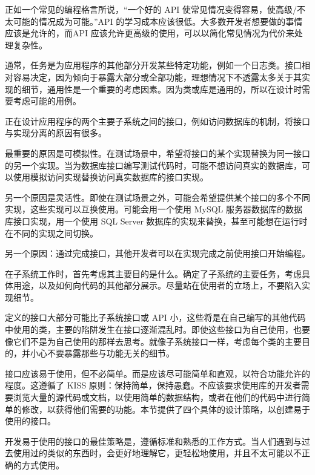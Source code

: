 正如一个常见的编程格言所说，“一个好的 API 使常见情况变得容易，使高级/不太可能的情况成为可能。”API 的学习成本应该很低。大多数开发者想要做的事情应该是允许的，而API 应该允许更高级的使用，可以以简化常见情况为代价来处理复杂性。


通常，任务是为应用程序的其他部分开发某些特定功能，例如一个日志类。接口相对容易决定，因为倾向于暴露大部分或全部功能，理想情况下不透露太多关于其实现的细节，通用性是一个重要的考虑因素。因为类或库是通用的，所以在设计时需要考虑可能的用例。


正在设计应用程序的两个主要子系统之间的接口，例如访问数据库的机制，将接口与实现分离的原因有很多。

最重要的原因是可模拟性。在测试场景中，希望将接口的某个实现替换为同一接口的另一个实现。当为数据库接口编写测试代码时，可能不想访问真实的数据库，可以使用模拟访问实现替换访问真实数据库的接口实现。

另一个原因是灵活性。即使在测试场景之外，可能会希望提供某个接口的多个不同实现，这些实现可以互换使用。可能会用一个使用 MySQL 服务器数据库的数据库接口实现，用一个使用 SQL Server 数据库的实现来替换，甚至可能想在运行时在不同的实现之间切换。

另一个原因：通过完成接口，其他开发者可以在实现完成之前使用接口开始编程。

在子系统工作时，首先考虑其主要目的是什么。确定了子系统的主要任务，考虑具体用途，以及如何向代码的其他部分展示。尽量站在使用者的立场上，不要陷入实现细节。


定义的接口大部分可能比子系统接口或 API 小，这些将是在自己编写的其他代码中使用的类，主要的陷阱发生在接口逐渐混乱时。即使这些接口为自己使用，也要像它们不是为自己使用的那样去思考。就像子系统接口一样，考虑每个类的主要目的，并小心不要暴露那些与功能无关的细节。


接口应该易于使用，但不必简单。而是应该尽可能简单和直观，以符合功能允许的程度。这遵循了 KISS 原则：保持简单，保持愚蠢。不应该要求使用库的开发者需要浏览大量的源代码或文档，以使用简单的数据结构，或者在他们的代码中进行简单的修改，以获得他们需要的功能。本节提供了四个具体的设计策略，以创建易于使用的接口。


开发易于使用的接口的最佳策略是，遵循标准和熟悉的工作方式。当人们遇到与过去使用过的类似的东西时，会更好地理解它，更轻松地使用，并且不太可能以不正确的方式使用。

